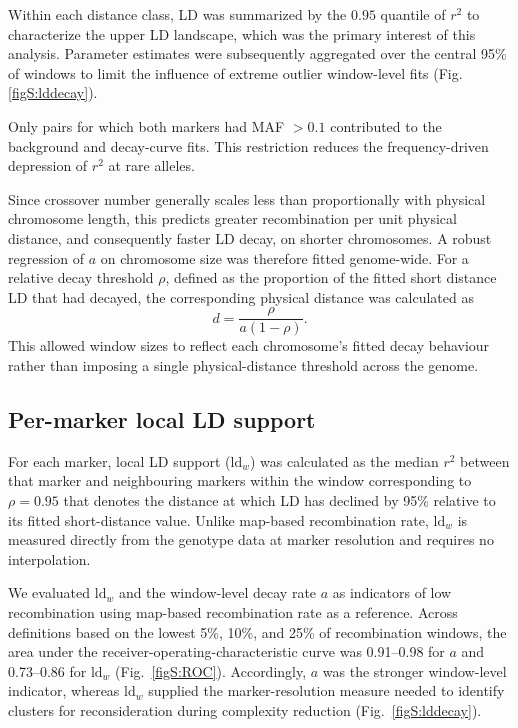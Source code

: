 \documentclass[11pt]{article}
\begin{document}
Within each distance class, LD was summarized by the \(0.95\) quantile of \(r^2\) to characterize the upper LD landscape, which was the primary interest of this analysis. Parameter estimates were subsequently aggregated over the central 95\% of windows to limit the influence of extreme outlier window-level fits (Fig. \ref{figS:lddecay}).

Only pairs for which both markers had MAF \(>0.1\) contributed to the background and decay-curve fits. This restriction reduces the frequency-driven depression of \(r^2\) at rare alleles.

Since crossover number generally scales less than proportionally with physical chromosome length, this predicts  greater recombination per unit physical distance, and consequently faster LD decay, on shorter chromosomes. A robust regression of \(a\) on chromosome size was therefore fitted genome-wide. For a relative decay threshold \(\rho\), defined as the proportion of the fitted short distance LD that had decayed, the corresponding physical distance was calculated as
\begin{equation}
  d = \frac{\rho}{a(1-\rho)}.
  \label{eq:distance}
\end{equation}
 This allowed window sizes to reflect each chromosome's fitted decay behaviour rather than imposing a single physical-distance threshold across the genome.

\subsection*{Per-marker local LD support}

For each marker, local LD support (\(\mathrm{ld}_w\)) was calculated as the median \(r^2\) between that marker and neighbouring markers within the window corresponding to \(\rho=0.95\) that denotes the distance at which LD has declined by 95\% relative to its fitted short-distance value. Unlike map-based recombination rate, \(\mathrm{ld}_w\) is measured directly from the genotype data at marker resolution and requires no interpolation.

We evaluated \(\mathrm{ld}_w\) and the window-level decay rate \(a\) as indicators of low recombination using map-based recombination rate as a reference. Across definitions based on the lowest 5\%, 10\%, and 25\% of recombination windows, the area under the receiver-operating-characteristic curve was 0.91--0.98 for \(a\) and 0.73--0.86 for \(\mathrm{ld}_w\) (Fig.~\ref{figS:ROC}). Accordingly, \(a\) was the stronger window-level indicator, whereas \(\mathrm{ld}_w\) supplied the marker-resolution measure needed to identify clusters for reconsideration during complexity reduction (Fig.~\ref{figS:lddecay}).
\end{document}
